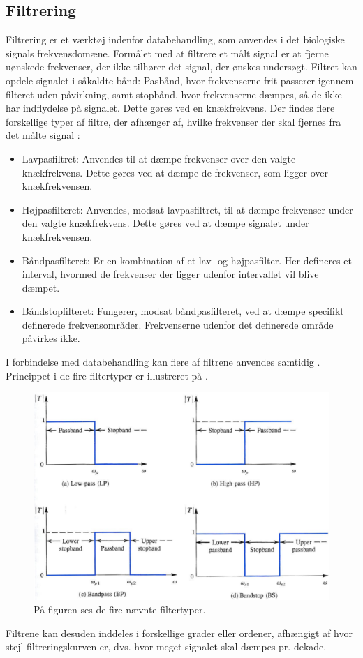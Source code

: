 \subsection{Filtrering}\label{Filterafsnit}
Filtrering er et værktøj indenfor databehandling, som anvendes i det biologiske signals frekvensdomæne. Formålet med at filtrere et målt signal er at fjerne uønskede frekvenser, der ikke tilhører det signal, der ønskes undersøgt. Filtret kan opdele signalet i såkaldte bånd: Pasbånd, hvor frekvenserne frit passerer igennem filteret uden påvirkning, samt stopbånd, hvor frekvenserne dæmpes, så de ikke har indflydelse på signalet. Dette gøres ved en knækfrekvens.
Der findes flere forskellige typer af filtre, der afhænger af, hvilke frekvenser der skal fjernes fra det målte signal \cite{Devasahayam2000}:

\begin{itemize}
	\item Lavpasfiltret: Anvendes til at dæmpe frekvenser over den valgte knækfrekvens. Dette gøres ved at dæmpe de frekvenser, som ligger over knækfrekvensen.
	\item Højpasfilteret: Anvendes, modsat lavpasfiltret, til at dæmpe frekvenser under den valgte knækfrekvens. Dette gøres ved at dæmpe signalet under knækfrekvensen.
	\item Båndpasfilteret: Er en kombination af et lav- og højpasfilter.  Her defineres et interval, hvormed de frekvenser der ligger udenfor intervallet vil blive dæmpet.
	\item Båndstopfilteret: Fungerer, modsat båndpasfilteret, ved at dæmpe specifikt definerede frekvensområder. Frekvenserne udenfor det definerede område påvirkes ikke. 
\end{itemize}
  
I forbindelse med databehandling kan flere af filtrene anvendes samtidig \cite{Devasahayam2000}. Princippet i de fire filtertyper er illustreret på .
\begin{figure}[H]
\centering
\includegraphics[scale=0.5]{figures/bproblemanalyse/filtertyper2.png}
\caption{På figuren ses de fire nævnte filtertyper. \cite{Sedra2010}}
\label{filtertyper}
\end{figure}
Filtrene kan desuden inddeles i forskellige grader eller ordener, afhængigt af hvor stejl filtreringskurven er, dvs. hvor meget signalet skal dæmpes pr. dekade\cite{Sedra2010}.


